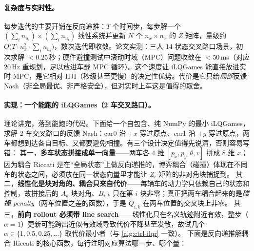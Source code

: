 \paragraph{复杂度与实时性。}
每步迭代的主要开销在反向递推：$T$ 个时间步，每步解一个 $(\sum_i n_{u_i})\times(\sum_i n_{u_i})$ 线性系统并更新 $N$ 个 $n_x\times n_x$ 的 $Z$ 矩阵，量级约 $O\big(T\cdot n_x^2\cdot\sum_i n_{u_i}\big)$，数次迭代即收敛。论文实测：三人 $14$ 状态交叉路口场景，初次求解 $<0.25$\,秒；硬件避撞测试中滚动时域（MPC）问题收敛在 $<50$\,ms（对应 $20$\,Hz 重规划，足以放进车载 MPC 循环）\cite{fridovich2020efficient}。这个速度让 iLQGames 能直接放进实时 MPC，是它相对 HJI（秒级甚至更慢）的决定性优势。代价是它只给\emph{局部}反馈 Nash（非全局最优、非严格安全），但对实时上车这是值得的取舍。

\paragraph{实现：一个能跑的 iLQGames（2 车交叉路口）。}
理论讲完，落到能跑的代码。下面给一个自包含、纯 NumPy 的最小 iLQGames，求解 2 车交叉路口的反馈 Nash：car0 沿 $+x$ 穿过原点、car1 沿 $+y$ 穿过原点，两车都想到达各自目标、又都要避免相撞。有三个设计决定值得先说清，否则容易写错：
其一，\textbf{多车状态拼接成单一向量}——两车各 $4$ 维 $[p_x,p_y,\theta,v]$ 拼成 $8$ 维 $x$；因为耦合 Riccati 是在“全局状态”上做反向递推的，博弈耦合（碰撞）体现在不同车的状态之间，必须放在同一状态向量里才能让 $Z_i$ 矩阵的非对角块捕捉到。
其二，\textbf{线性化是块对角的、耦合只来自代价}——每辆车的动力学只依赖自己的状态和控制，故拼接后的 $A_k$ 块对角、$B_{i,k}$ 只在第 $i$ 块非零；真正把两车耦合起来的是\emph{碰撞 penalty}（两车位置之差的函数），于是 $Q_{i,k}$ 在两车位置的交叉块上非零。
其三，\textbf{前向 rollout 必须带 line search}——线性化只在名义轨迹附近有效，整步（$\alpha=1$）更新可能跨出近似有效域导致代价不降甚至发散，故试几个 $\alpha\in\{1,0.5,0.25,\dots\}$ 取代价最小者（与 \cref{alg:ctrl-ilqr} 一致）。
下面是反向递推解耦合 Riccati 的核心函数，每行注明对应算法哪一步、哪个量：

